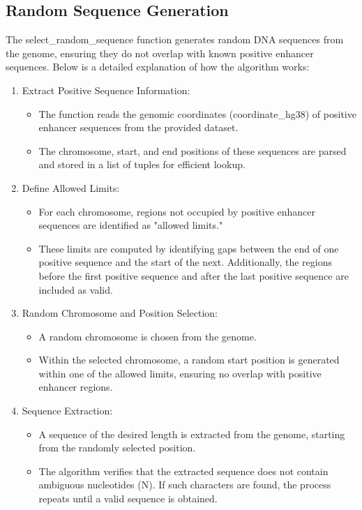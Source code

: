 \documentclass[11pt, a4paper, hidelinks]{article}
\begin{document}
\subsection{Random Sequence Generation}\label{subsec:random-sequence-generation}

The select\_random\_sequence function generates random DNA sequences from the genome, ensuring they do not overlap with known positive enhancer sequences. Below is a detailed explanation of how the algorithm works:

\begin{enumerate}

    \item Extract Positive Sequence Information:
    \begin{itemize}
        \item The function reads the genomic coordinates (coordinate\_hg38) of positive enhancer sequences from the provided dataset.
        \item The chromosome, start, and end positions of these sequences are parsed and stored in a list of tuples for efficient lookup.
    \end{itemize}

    \item Define Allowed Limits:
    \begin{itemize}
        \item For each chromosome, regions not occupied by positive enhancer sequences are identified as "allowed limits."
        \item These limits are computed by identifying gaps between the end of one positive sequence and the start of the next. Additionally, the regions before the first positive sequence and after the last positive sequence are included as valid.
    \end{itemize}
    
    \item Random Chromosome and Position Selection:
    \begin{itemize}
        \item A random chromosome is chosen from the genome.
        \item Within the selected chromosome, a random start position is generated within one of the allowed limits, ensuring no overlap with positive enhancer regions.
    \end{itemize}
    
    \item Sequence Extraction:
    \begin{itemize}
        \item A sequence of the desired length is extracted from the genome, starting from the randomly selected position.
        \item The algorithm verifies that the extracted sequence does not contain ambiguous nucleotides (N). If such characters are found, the process repeats until a valid sequence is obtained.
    \end{itemize}

\end{enumerate}
\end{document}
